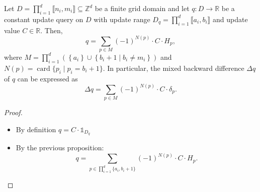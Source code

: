 \documentclass[
    t,10pt,
    handout
]{beamer}
\newif\ifqedplaced
\DeclareMathOperator{\card}{card}
\begin{document}
\begin{frame}
    \begin{corollary*}{}
	Let \( D = \prod_{i=1}^d \llbracket n_i, m_i \rrbracket \subseteq \mathbb{Z}^d \) be a finite grid domain and let \( q : D \to \mathbb R \) be a constant update query on \( D \) with update range \( D_q = \prod_{i=1}^d \llbracket a_i, b_i \rrbracket \) and update value \( C \in \mathbb{R} \). 
	Then, 
	\begin{equation*}
	    q = \sum_{p \in M} (-1)^{N(p)} \cdot C \cdot H_p,
	\end{equation*}
	where \( M = \prod_{i=1}^d \left( \left\{a_i\right\} \cup \left\{ b_i + 1 \mid b_i \neq m_i \right\} \right) \) and \( N(p) = \card\{ p_i \mid p_i = b_i+1 \} \). 
	In particular, the mixed backward difference \( \Delta q \) of \( q \) can be expressed as 
	\begin{equation*}
	    \Delta q = \sum_{p \in M} (-1)^{N(p)} \cdot C \cdot \delta_p. 
	\end{equation*}
    \end{corollary*}
    \begin{proof}
    \begin{itemize}[<+->] 
	    \item By definition \( q = C \cdot \mathbb{1}_{D_q} \) 

        \item By the previous proposition: 
            \begin{equation*}
                q = \sum_{p \in \prod_{i=1}^d \{a_i,b_i+1\}} (-1)^{N(p)} \cdot C \cdot H_p.
            \end{equation*}
	\end{itemize}
    \global\qedplacedtrue
    \end{proof}
\end{frame}
\end{document}
